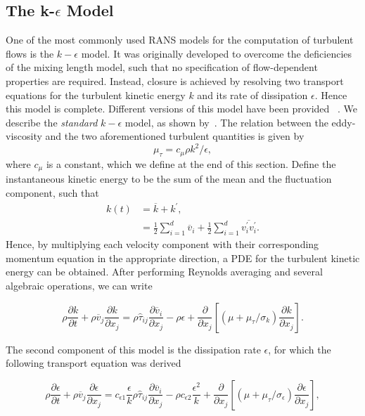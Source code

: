 \subsection{The k-$\epsilon$ Model}
One of the most commonly used RANS models for the computation of turbulent flows is the $k-\epsilon$ model. It was originally developed to overcome the deficiencies of the mixing length model, such that no specification of flow-dependent properties are required. Instead, closure is achieved by resolving two transport equations for the turbulent kinetic energy $k$ and its rate of dissipation $\epsilon$. Hence this model is complete. Different versions of this model have been provided ~\cite{launderApplicationEnergydissipationModel1974, jonesPredictionLaminarizationTwoequation1972}. We describe the \textit{standard} $k-\epsilon$ model, as shown by~\cite{bardinaTurbulenceModelingValidation1997}. The relation between the eddy-viscosity and the two aforementioned turbulent quantities is given by
\begin{equation}
    \mu_\tau = c_\mu \rho k^2/\epsilon,
\end{equation}
where $c_\mu$ is a constant, which we define at the end of this section. Define the instantaneous kinetic energy to be the sum of the mean and the fluctuation component, such that
\begin{align}
    k(t) &= \overline{k} + k^\prime, \nonumber \\
         &= \frac{1}{2} \sum_{i=1}^d \overline{v}_i + \frac{1}{2}\sum_{i=1}^d \overline{v_i^\prime v_i^\prime}.
\end{align}
Hence, by multiplying each velocity component with their corresponding momentum equation in the appropriate direction, a PDE for the turbulent kinetic energy can be obtained. After performing Reynolds averaging and several algebraic operations, we can write
\begin{eqBox}
\begin{equation}
    \rho\frac{\partial k}{\partial t} + 
    \rho\overline v_j \frac{\partial k}{\partial x_j} 
    = \rho \hat \tau_{ij} \frac{\partial \overline v_i}{\partial x_j}
    - \rho\epsilon + \frac{\partial}{\partial x_j}\left[(\mu + \mu_\tau/\sigma_k)\frac{\partial k}{\partial x_j}\right].
\end{equation}
\end{eqBox}
The second component of this model is the dissipation rate $\epsilon$, for which the following transport equation was derived
\begin{eqBox}
\begin{equation}
    \rho \frac{\partial \epsilon}{\partial t}
    + \rho\overline v_j \frac{\partial\epsilon}{\partial x_j}
    = c_{\epsilon 1}\frac{\epsilon}{k}  \rho \hat \tau_{ij} \frac{\partial \overline v_i}{\partial x_j}
    - \rho c_{\epsilon2} \frac{\epsilon^2}{k} 
    + \frac{\partial}{\partial x_j} \left[(\mu + \mu_\tau/\sigma_\epsilon) \frac{\partial\epsilon}{\partial x_j}\right],
\end{equation}
\end{eqBox}

